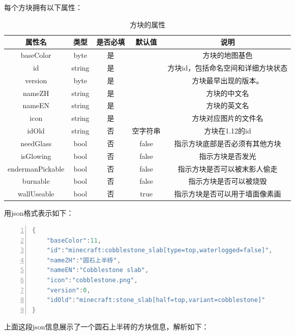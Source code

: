 \documentclass{article}
\begin{document}
   每个方块拥有以下属性：
   \begin{table}[h]
    \centering
    \caption{方块的属性}
    \begin{tabular}{ccccc}
        \hline
        属性名 & 类型 & 是否必填 & 默认值 & 说明  \\ \hline
        baseColor & byte & 是 & & 方块的地图基色 \\
        id & string & 是 & & 方块id，包括命名空间和详细方块状态\\
        version & byte & 是 & & 方块最早出现的版本。 \\
        nameZH & string & 是 & & 方块的中文名 \\
        nameEN & string & 是 & & 方块的英文名 \\
        icon & string & 是 & & 方块对应图片的文件名 \\
        idOld & string & 否 & 空字符串 & 方块在1.12的id \\
        needGlass & bool & 否 & false & 指示方块底部是否必须有其他方块 \\
        isGlowing & bool & 否 & false & 指示方块是否发光 \\
        endermanPickable & bool & 否 & false & 指示方块是否可以被末影人偷走 \\
        burnable & bool & 否 & false & 指示方块是否可以被烧毁 \\
        wallUseable & bool & 否 & true & 指示方块是否可以用于墙面像素画 \\
        \hline 
    \end{tabular}       
   \end{table}
   
   \clearpage
   用json格式表示如下：
\begin{lstlisting}[language = C++, numbers=left, 
    numberstyle=\tiny,keywordstyle=\color{blue!70},
    commentstyle=\color{red!50!green!50!blue!50},frame=shadowbox,
    rulesepcolor=\color{red!20!green!20!blue!20},basicstyle=\ttfamily]
{
    "baseColor":11,
    "id":"minecraft:cobblestone_slab[type=top,waterlogged=false]",
    "nameZH":"圆石上半砖",
    "nameEN":"Cobblestone slab",
    "icon":"cobblestone.png",
    "version":0,
    "idOld":"minecraft:stone_slab[half=top,variant=cobblestone]"
}
    \end{lstlisting}
    上面这段json信息展示了一个圆石上半砖的方块信息，解析如下：
\end{document}
